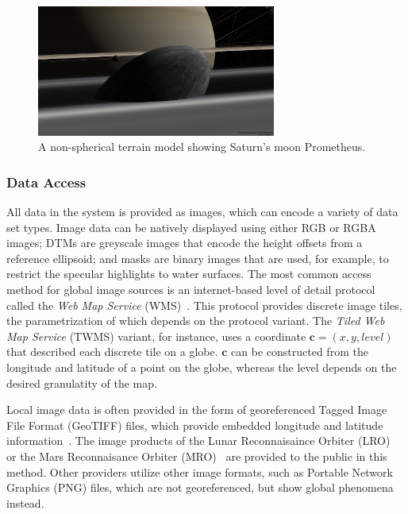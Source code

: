 \begin{figure}[b]
\centering
\includegraphics[width=0.7\textwidth]{figures/contributions/gb/prometheus.png}
\caption{A non-spherical terrain model showing Saturn's moon Prometheus.}
\label{contributions:astro:gb:prometheus}
\end{figure}


\subsubsection{Data Access} \label{contributions:astro:gb:access}
All data in the system is provided as  images, which can encode a variety of data set types.  Image data can be natively displayed using either RGB or RGBA images;  DTMs are greyscale images that encode the height offsets from a reference ellipsoid;  and masks are binary images that are used, for example, to restrict the specular highlights to water surfaces.  The most common access method for global image sources is an internet-based level of detail protocol called the \emph{Web Map Service} (WMS)~\cite{open2006opengis, maso2010opengis}.  This protocol provides discrete image tiles, the parametrization of which depends on the protocol variant.  The \emph{Tiled Web Map Service} (TWMS) variant, for instance, uses a  coordinate $\textbf{c} = (x,y,level)$ that described each discrete tile on a globe.  $\textbf{c}$ can be constructed from the longitude and latitude of a point on the globe, whereas the level depends on the desired granulatity of the map.

Local image data is often provided in the form of georeferenced Tagged Image File Format (GeoTIFF) files, which provide embedded longitude and latitude information~\cite{ritter2000geotiff}.  The image products of the Lunar Reconnaisaince Orbiter (LRO)~\cite{vondrak2010lunar} or the Mars Reconnaisance Orbiter (MRO)~\cite{mcewen2016people} are provided to the public in this method.  Other providers utilize other image formats, such as Portable Network Graphics (PNG) files, which are not georeferenced, but show global phenomena instead.

